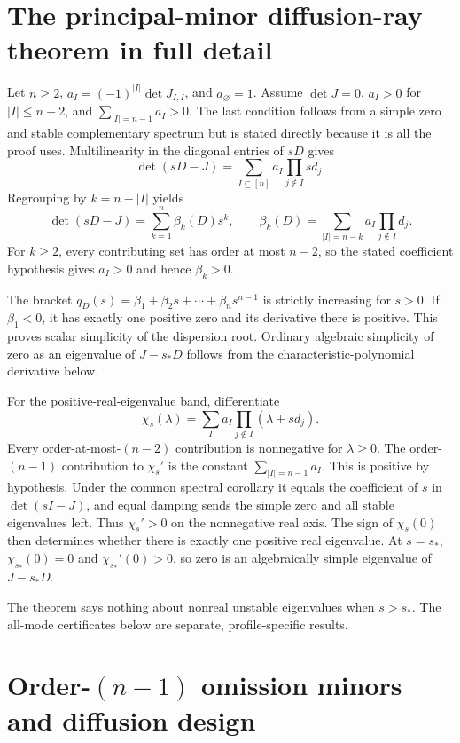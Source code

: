 \documentclass[10pt]{article}
\newcommand{\1}{\mathbf1}
\begin{document}
\section{The principal-minor diffusion-ray theorem in full detail}


Let $n\ge2$, $a_I=(-1)^{|I|}\det J_{I,I}$, and $a_\varnothing=1$.  Assume
$\det J=0$, $a_I>0$ for $|I|\le n-2$, and
$\sum_{|I|=n-1}a_I>0$.  The last condition follows from a simple zero and
stable complementary spectrum but is stated directly because it is all the
proof uses.  Multilinearity in the diagonal entries of $sD$ gives
\[
 \det(sD-J)=\sum_{I\subseteq[n]}a_I
 \prod_{j\notin I}sd_j.
\]
Regrouping by $k=n-|I|$ yields
\[
 \det(sD-J)=\sum_{k=1}^n\beta_k(D)s^k,
 \qquad
 \beta_k(D)=\sum_{|I|=n-k}a_I\prod_{j\notin I}d_j.
\]
For $k\ge2$, every contributing set has order at most $n-2$, so the stated coefficient hypothesis gives $a_I>0$ and hence $\beta_k>0$.

The bracket $q_D(s)=\beta_1+\beta_2s+\cdots+\beta_ns^{n-1}$ is strictly
increasing for $s>0$.  If $\beta_1<0$, it has exactly one positive zero and
its derivative there is positive.  This proves scalar simplicity of the
dispersion root.  Ordinary algebraic simplicity of zero as an eigenvalue of
$J-s_*D$ follows from the characteristic-polynomial derivative below.

For the positive-real-eigenvalue band, differentiate
\[
 \chi_s(\lambda)=\sum_Ia_I\prod_{j\notin I}(\lambda+sd_j).
\]
Every order-at-most-$(n-2)$ contribution is nonnegative for $\lambda\ge0$.
The order-$(n-1)$ contribution to $\chi_s'$ is the constant
$\sum_{|I|=n-1}a_I$.  This is positive by hypothesis.  Under the common spectral corollary it equals the coefficient of $s$ in $\det(sI-J)$, and equal damping sends the simple zero and all stable eigenvalues left.  Thus $\chi_s'>0$ on the
nonnegative real axis.  The sign of $\chi_s(0)$ then determines whether there
is exactly one positive real eigenvalue.  At $s=s_*$,
$\chi_{s_*}(0)=0$ and $\chi_{s_*}'(0)>0$, so zero is an algebraically simple
eigenvalue of $J-s_*D$.

The theorem says nothing about nonreal unstable eigenvalues when $s>s_*$.
The all-mode certificates below are separate, profile-specific results.

\section{Order-\texorpdfstring{$(n-1)$}{(n-1)} omission minors and diffusion design}
\end{document}

